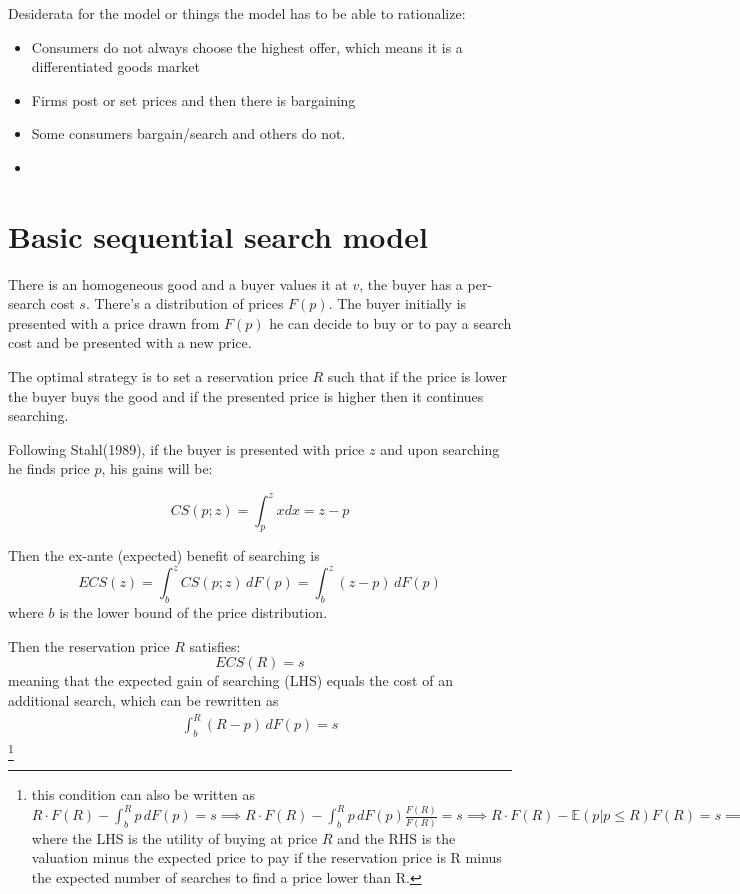 \documentclass[12pt]{article}
\theoremstyle{plain}
\theoremstyle{plain}
\begin{document}
 
Desiderata for the model or things the model has to be able to rationalize: 
\begin{itemize}
    \item Consumers do not always choose the highest offer, which means it is a differentiated goods market 
    \item Firms post or set prices and then there is bargaining 
    \item Some consumers bargain/search and others do not. 
    \item 
\end{itemize}

\section{Basic sequential search model}

There is an homogeneous good and a  buyer values it at $v$, the buyer has a per-search cost $s$. There's a distribution of prices $F(p)$. The buyer initially is presented with a price drawn from $F(p)$ he can decide to buy or to pay a search cost and be presented with a new price. 

The optimal strategy is to set a reservation price $R$ such that if the price is lower the buyer buys the good and if the presented price is higher then it continues searching. 


Following Stahl(1989), if the buyer is presented with price $z$ and upon searching he finds price $p$, his gains will be: 

$$
CS(p; z) = \int_p^z x dx  = z-p
$$

Then the ex-ante (expected) benefit of searching is
\[
ECS(z) = \int_b^z CS(p; z)\, dF(p)
= \int_b^z (z - p)\, dF(p)
\]
where $b$ is the lower bound of the price distribution. 

Then the reservation price $R$ satisfies:
$$ECS(R) = s$$
meaning that the expected gain of searching (LHS) equals the cost of an additional search, which can be rewritten as 
\begin{align}\label{eq:sequential1}
     \int_b^R (R - p)\, dF(p) = s 
\end{align}\footnote{this condition can also be written as $R \cdot F(R) - \int_b^R p\, dF(p)
= s
 \implies R \cdot F(R) - \int_b^R p\, dF(p)  \frac{F(R)}{F(R)}
= s  \implies R \cdot F(R) - \mathbb{E}(p|p\leq R) F(R) = s \implies R = \mathbb{E}(p|p\leq R) +  \frac{s}{F(R)} \implies v-R = v- \mathbb{E}(p|p\leq R) -  \frac{s}{F(R)}  $ where the LHS is the utility of buying at price $R$ and the RHS is the valuation minus the expected price to pay if the reservation price is R minus the expected number of searches to find a price lower than R. }
\end{document}
